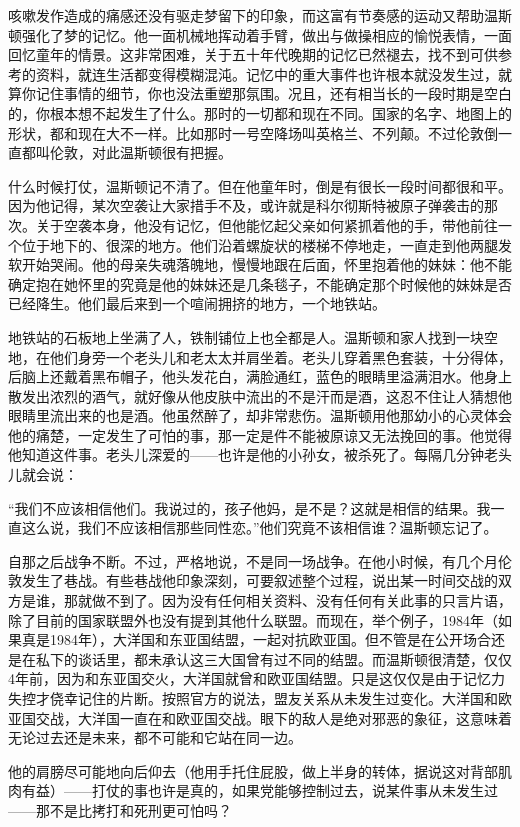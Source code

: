 咳嗽发作造成的痛感还没有驱走梦留下的印象，而这富有节奏感的运动又帮助温斯顿强化了梦的记忆。他一面机械地挥动着手臂，做出与做操相应的愉悦表情，一面回忆童年的情景。这非常困难，关于五十年代晚期的记忆已然褪去，找不到可供参考的资料，就连生活都变得模糊混沌。记忆中的重大事件也许根本就没发生过，就算你记住事情的细节，你也没法重塑那氛围。况且，还有相当长的一段时期是空白的，你根本想不起发生了什么。那时的一切都和现在不同。国家的名字、地图上的形状，都和现在大不一样。比如那时一号空降场叫英格兰、不列颠。不过伦敦倒一直都叫伦敦，对此温斯顿很有把握。

什么时候打仗，温斯顿记不清了。但在他童年时，倒是有很长一段时间都很和平。因为他记得，某次空袭让大家措手不及，或许就是科尔彻斯特被原子弹袭击的那次。关于空袭本身，他没有记忆，但他能忆起父亲如何紧抓着他的手，带他前往一个位于地下的、很深的地方。他们沿着螺旋状的楼梯不停地走，一直走到他两腿发软开始哭闹。他的母亲失魂落魄地，慢慢地跟在后面，怀里抱着他的妹妹：他不能确定抱在她怀里的究竟是他的妹妹还是几条毯子，不能确定那个时候他的妹妹是否已经降生。他们最后来到一个喧闹拥挤的地方，一个地铁站。

地铁站的石板地上坐满了人，铁制铺位上也全都是人。温斯顿和家人找到一块空地，在他们身旁一个老头儿和老太太并肩坐着。老头儿穿着黑色套装，十分得体，后脑上还戴着黑布帽子，他头发花白，满脸通红，蓝色的眼睛里溢满泪水。他身上散发出浓烈的酒气，就好像从他皮肤中流出的不是汗而是酒，这忍不住让人猜想他眼睛里流出来的也是酒。他虽然醉了，却非常悲伤。温斯顿用他那幼小的心灵体会他的痛楚，一定发生了可怕的事，那一定是件不能被原谅又无法挽回的事。他觉得他知道这件事。老头儿深爱的------也许是他的小孙女，被杀死了。每隔几分钟老头儿就会说：

``我们不应该相信他们。我说过的，孩子他妈，是不是？这就是相信的结果。我一直这么说，我们不应该相信那些同性恋。''他们究竟不该相信谁？温斯顿忘记了。

自那之后战争不断。不过，严格地说，不是同一场战争。在他小时候，有几个月伦敦发生了巷战。有些巷战他印象深刻，可要叙述整个过程，说出某一时间交战的双方是谁，那就做不到了。因为没有任何相关资料、没有任何有关此事的只言片语，除了目前的国家联盟外也没有提到其他什么联盟。而现在，举个例子，1984年（如果真是1984年），大洋国和东亚国结盟，一起对抗欧亚国。但不管是在公开场合还是在私下的谈话里，都未承认这三大国曾有过不同的结盟。而温斯顿很清楚，仅仅4年前，因为和东亚国交火，大洋国就曾和欧亚国结盟。只是这仅仅是由于记忆力失控才侥幸记住的片断。按照官方的说法，盟友关系从未发生过变化。大洋国和欧亚国交战，大洋国一直在和欧亚国交战。眼下的敌人是绝对邪恶的象征，这意味着无论过去还是未来，都不可能和它站在同一边。

他的肩膀尽可能地向后仰去（他用手托住屁股，做上半身的转体，据说这对背部肌肉有益）------打仗的事也许是真的，如果党能够控制过去，说某件事从未发生过------那不是比拷打和死刑更可怕吗？

